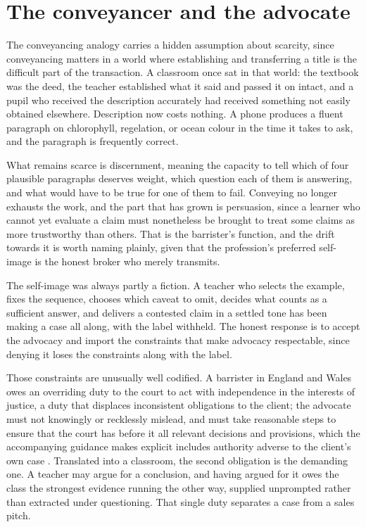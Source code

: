 \section{The conveyancer and the advocate}

The conveyancing analogy carries a hidden assumption about scarcity, since conveyancing matters in a world where establishing and transferring a title is the difficult part of the transaction. A classroom once sat in that world: the textbook was the deed, the teacher established what it said and passed it on intact, and a pupil who received the description accurately had received something not easily obtained elsewhere. Description now costs nothing. A phone produces a fluent paragraph on chlorophyll, regelation, or ocean colour in the time it takes to ask, and the paragraph is frequently correct.

What remains scarce is discernment, meaning the capacity to tell which of four plausible paragraphs deserves weight, which question each of them is answering, and what would have to be true for one of them to fail. Conveying no longer exhausts the work, and the part that has grown is persuasion, since a learner who cannot yet evaluate a claim must nonetheless be brought to treat some claims as more trustworthy than others. That is the barrister's function, and the drift towards it is worth naming plainly, given that the profession's preferred self-image is the honest broker who merely transmits.

The self-image was always partly a fiction. A teacher who selects the example, fixes the sequence, chooses which caveat to omit, decides what counts as a sufficient answer, and delivers a contested claim in a settled tone has been making a case all along, with the label withheld. The honest response is to accept the advocacy and import the constraints that make advocacy respectable, since denying it loses the constraints along with the label.

Those constraints are unusually well codified. A barrister in England and Wales owes an overriding duty to the court to act with independence in the interests of justice, a duty that displaces inconsistent obligations to the client; the advocate must not knowingly or recklessly mislead, and must take reasonable steps to ensure that the court has before it all relevant decisions and provisions, which the accompanying guidance makes explicit includes authority adverse to the client's own case \citep{bsb2026}. Translated into a classroom, the second obligation is the demanding one. A teacher may argue for a conclusion, and having argued for it owes the class the strongest evidence running the other way, supplied unprompted rather than extracted under questioning. That single duty separates a case from a sales pitch.

